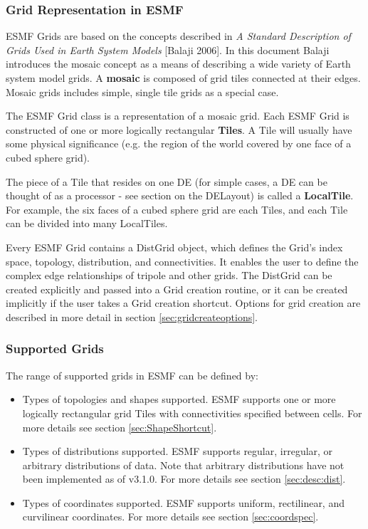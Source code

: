 \subsubsection{Grid Representation in ESMF}

ESMF Grids are based on the concepts described in {\it A Standard
Description of Grids Used in Earth System Models} [Balaji 2006].  In this document
Balaji introduces the mosaic concept as a means of describing
a wide variety of Earth system model grids.  A {\bf mosaic} is
composed of grid tiles connected at their edges.  Mosaic grids
includes simple, single tile grids as a special case.  

The ESMF Grid class is a representation of a mosaic grid.  Each ESMF
Grid is constructed of one or more logically rectangular {\bf Tiles}.
A Tile will usually have some physical significance (e.g. the region
of the world covered by one face of a cubed sphere grid).

The piece of a Tile that resides on one DE (for simple cases, a DE
can be thought of as a processor - see section on the DELayout)
is called a {\bf LocalTile}.  For example, the six faces of a cubed
sphere grid are each Tiles, and each Tile can be divided into many
LocalTiles.  

Every ESMF Grid contains a DistGrid object, which defines the Grid's
index space, topology, distribution, and connectivities.  It enables
the user to define the complex edge relationships of tripole and other
grids.  The DistGrid can be created explicitly and passed into a Grid
creation routine, or it can be created implicitly if the user takes
a Grid creation shortcut.  Options for grid creation are described in 
more detail in section \ref{sec:gridcreateoptions}.

\subsubsection{Supported Grids}

The range of supported grids in ESMF can be defined by:
\begin{itemize}
\item Types of topologies and shapes supported.  ESMF supports one or
more logically rectangular grid Tiles with connectivities specified
between cells.  For more details see section \ref{sec:ShapeShortcut}.
\item Types of distributions supported.  ESMF supports  regular,
irregular, or arbitrary distributions of data.  Note that arbitrary
distributions have not been implemented as of v3.1.0.
For more details see section \ref{sec:desc:dist}.
\item Types of coordinates supported.  ESMF supports uniform, rectilinear,
and curvilinear coordinates.  For more details see section \ref{sec:coordspec}.
\end{itemize}

